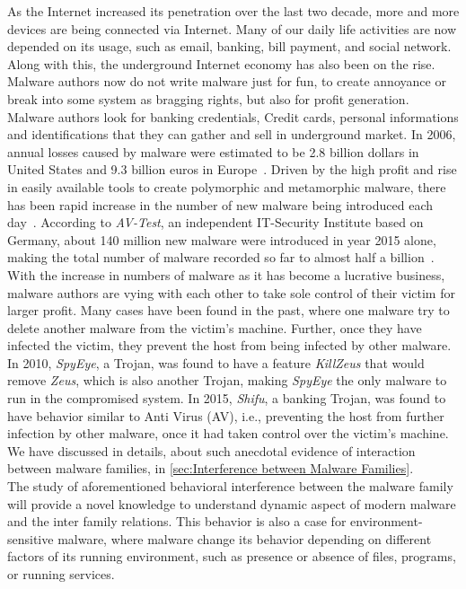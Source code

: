 As the Internet increased its penetration over the last two decade, more and more devices are being connected via Internet.
Many of our daily life activities are now depended on its usage, such as email, banking, bill payment, and social network.
Along with this, the underground Internet economy has also been on the rise.
Malware authors now do not write malware just for fun, to create annoyance or break into some system as bragging rights, but also for profit generation.
Malware authors look for banking credentials, Credit cards, personal informations and identifications that they can gather and sell in underground market.
In 2006, annual losses caused by malware were estimated to be 2.8 billion dollars in United States and 9.3 billion euros in Europe~\cite[]{moore2009economics}.
Driven by the high profit and rise in easily available tools to create polymorphic and metamorphic malware, there has been rapid increase in the number of new malware being introduced each day~\cite[]{tian}.
According to \emph{AV-Test}, an independent IT-Security Institute based on Germany, about 140 million new malware were introduced in year 2015 alone, making the total number of malware recorded so far to almost half a billion~\cite[]{avtest}.
\\
With the increase in numbers of malware as it has become a lucrative business, malware authors are vying with each other to take sole control of their victim for larger profit.
Many cases have been found in the past, where one malware try to delete another malware from the victim's machine.
Further, once they have infected the victim, they prevent the host from being infected by other malware.
In 2010, \emph{SpyEye}, a Trojan, was found to have a feature \emph{KillZeus} that would remove \emph{Zeus}, which is also another Trojan, making \emph{SpyEye} the only malware to run in the compromised system.
In 2015, \emph{Shifu}, a banking Trojan, was found to have behavior similar to Anti Virus (AV), i.e., preventing the host from further infection by other malware, once it had taken control over the victim's machine.
We have discussed in details, about such anecdotal evidence of interaction between malware families, in \autoref{sec:Interference between Malware Families}.\\
The study of aforementioned behavioral interference between the malware family will provide a novel knowledge to understand dynamic aspect of modern malware and the inter family relations.
This behavior is also a case for environment-sensitive malware, where malware change its behavior depending on different factors of its running environment, such as presence or absence of files, programs, or running services.
